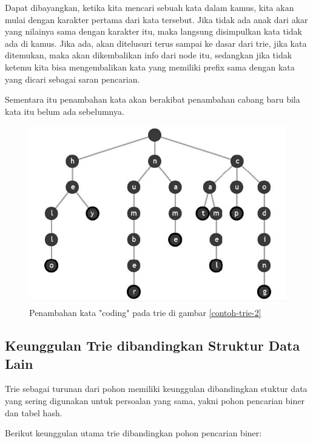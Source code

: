 Dapat dibayangkan, ketika kita mencari sebuah kata dalam kamus, kita akan mulai dengan karakter pertama dari kata tersebut. Jika tidak ada anak dari akar yang nilainya sama dengan karakter itu, maka langsung disimpulkan kata tidak ada di kamus. Jika ada, akan ditelusuri terus sampai ke dasar dari trie, jika kata ditemukan, maka akan dikembalikan info dari node itu, sedangkan jika tidak ketemu kita bisa mengembalikan kata yang memiliki prefix sama dengan kata yang dicari sebagai saran pencarian.

Sementara itu penambahan kata akan berakibat penambahan cabang baru bila kata itu belum ada sebelumnya.

\begin{figure}[H]
\centering
\includegraphics[scale=1.25]{Gambar/contoh-trie-3}
\caption[Trie]{Penambahan kata "coding" pada trie di gambar \ref{contoh-trie-2}\cite{najogie:10:trie}} 
\label{contoh-trie-3}
\end{figure}

\subsection{Keunggulan Trie dibandingkan Struktur Data Lain}
\label{sec:keunggulanTrie}

Trie sebagai turunan dari pohon memiliki keunggulan dibandingkan stuktur data yang sering digunakan untuk persoalan yang sama, yakni pohon pencarian biner dan tabel hash.

Berikut keunggulan utama trie dibandingkan pohon pencarian biner:

